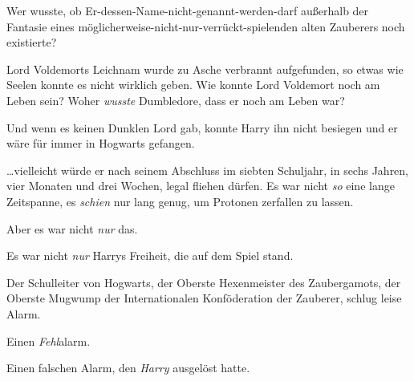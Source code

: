 Wer wusste, ob Er-dessen-Name-nicht-genannt-werden-darf außerhalb der Fantasie eines möglicherweise-nicht-nur-verrückt-spielenden alten Zauberers noch existierte?

Lord Voldemorts Leichnam wurde zu Asche verbrannt aufgefunden, so etwas wie Seelen konnte es nicht wirklich geben. Wie konnte Lord Voldemort noch am Leben sein? Woher \emph{wusste} Dumbledore, dass er noch am Leben war?

Und wenn es keinen Dunklen Lord gab, konnte Harry ihn nicht besiegen und er wäre für immer in Hogwarts gefangen.

…vielleicht würde er nach seinem Abschluss im siebten Schuljahr, in sechs Jahren, vier Monaten und drei Wochen, legal fliehen dürfen. Es war nicht \emph{so} eine lange Zeitspanne, es \emph{schien} nur lang genug, um Protonen zerfallen zu lassen.

Aber es war nicht \emph{nur} das.

Es war nicht \emph{nur} Harrys Freiheit, die auf dem Spiel stand.

Der Schulleiter von Hogwarts, der Oberste Hexenmeister des Zaubergamots, der Oberste Mugwump der Internationalen Konföderation der Zauberer, schlug leise Alarm.

Einen \emph{Fehl}{}alarm.

Einen falschen Alarm, den \emph{Harry} ausgelöst hatte.

